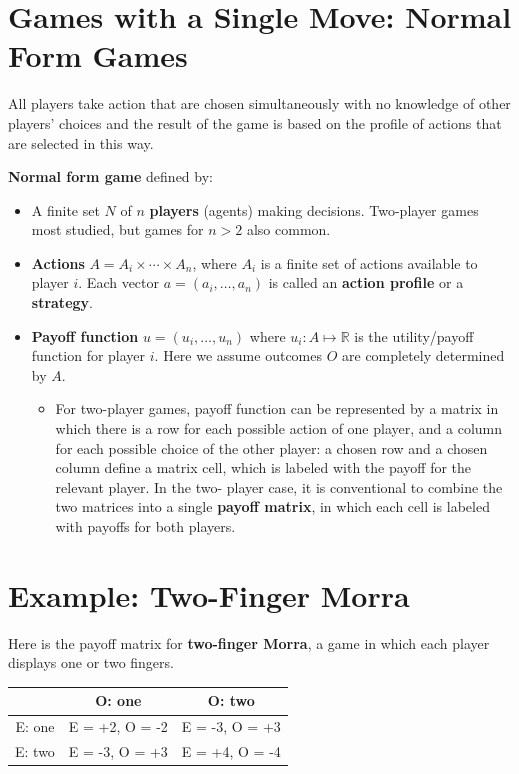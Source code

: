 \documentclass[11pt]{article}
\begin{document}
\section{Games with a Single Move: Normal Form Games}
\label{sec:org4338ee8}

All players take action that are chosen simultaneously with no knowledge of other players' choices and the result of the game is based on the profile of actions that are selected in this way.

\textbf{Normal form game} defined by:

\begin{itemize}
\item A finite set \(N\) of \(n\) \textbf{players} (agents) making decisions. Two-player games most studied, but games for \(n > 2\) also common.

\item \textbf{Actions} \(A = A_i \times \cdots \times A_n\), where \(A_i\) is a finite set of actions available to player \(i\).  Each vector \(a = (a_i, \dots, a_n)\) is called an \textbf{action profile} or a \textbf{strategy}.

\item \textbf{Payoff function} \(u = (u_i, \dots, u_n)\) where \(u_i \colon A \mapsto \mathbb{R}\) is the utility/payoff function for player \(i\). Here we assume outcomes \(O\) are completely determined by \(A\).

\begin{itemize}
\item For two-player games, payoff function can be represented by a matrix in which there is a row for each possible action of one player, and a column for each possible choice of the other player: a chosen row and a chosen column define a matrix cell, which is labeled with the payoff for the relevant player. In the two- player case, it is conventional to combine the two matrices into a single \textbf{payoff matrix}, in which each cell is labeled with payoffs for both players.
\end{itemize}
\end{itemize}
\section{Example: Two-Finger Morra}
\label{sec:org3a92b74}

Here is the payoff matrix for \textbf{two-finger Morra}, a game in which each player displays one or two fingers.


\begin{tabular}{|c|c|c|}\hline
       & O: one         & O: two         \\\hline
E: one & E = +2, O = -2 & E = -3, O = +3 \\\hline
E: two & E = -3, O = +3 & E = +4, O = -4 \\\hline
\end{tabular}
\end{document}
